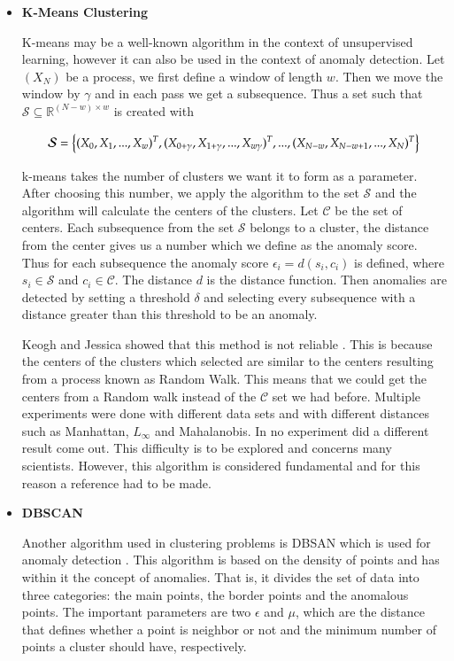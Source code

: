 \documentclass[a4paper,12pt]{report}
\theoremstyle{definitionNODot}
\begin{document}
	\begin{itemize}
		\item \textbf{K-Means Clustering}
		
		K-means may be a well-known algorithm in the context of unsupervised learning, however it can also be used in the context of anomaly detection. Let $(X_N)$ be a process, we first define a window of length $w$. Then we move the window by $\gamma$ and in each pass we get a subsequence. Thus a set such that  $\mathcal{S}\subseteq\mathbb{R}^{(N-w)\times w}$ is created with
		
		$$\mathcal{S} = \Bigl \{(X_0,X_1,...,X_w)^T , (X_{0+\gamma},X_{1+\gamma},...,X_{w\gamma})^T ,..., (X_{N-w},X_{N-w+1},...,X_{N})^T \Bigl \}$$
		
		k-means takes the number of clusters we want it to form as a parameter. After choosing this number, we apply the algorithm to the set $\mathcal{S}$ and the algorithm will calculate the centers of the clusters. Let $\mathcal{C}$ be the set of centers. Each subsequence from the set $\mathcal{S}$ belongs to a cluster, the distance from the center gives us a number which we define as the anomaly score. Thus for each subsequence the anomaly score $\epsilon_i = d(s_i,c_i)$ is defined, where $s_i\in\mathcal{S}$ and $c_i\in\mathcal{C}$. The distance $d$ is the distance function. Then anomalies are detected by setting a threshold $\delta$ and selecting every subsequence with a distance greater than this threshold to be an anomaly.
		
		Keogh and Jessica showed that this method is not reliable \cite{KeoghJessica2005}. This is because the centers of the clusters which selected are similar to the centers resulting from a process known as Random Walk. This means that we could get the centers from a Random walk instead of the $\mathcal{C}$ set we had before. Multiple experiments were done with different data sets and with different distances such as Manhattan, $L_\infty$ and Mahalanobis. In no experiment did a different result come out. This difficulty is to be explored and concerns many scientists. However, this algorithm is considered fundamental and for this reason a reference had to be made.
		
		\item \textbf{DBSCAN}
		
		Another algorithm used in clustering problems is DBSAN which is used for anomaly detection \cite{MartinKriegelXiaowei1996DBSCAN1996}. This algorithm is based on the density of points and has within it the concept of anomalies. That is, it divides the set of data into three categories: the main points, the border points and the anomalous points. The important parameters are two $\epsilon$ and $\mu$, which are the distance that defines whether a point is neighbor or not and the minimum number of points a cluster should have, respectively.
		

\end{itemize}
\end{document}

